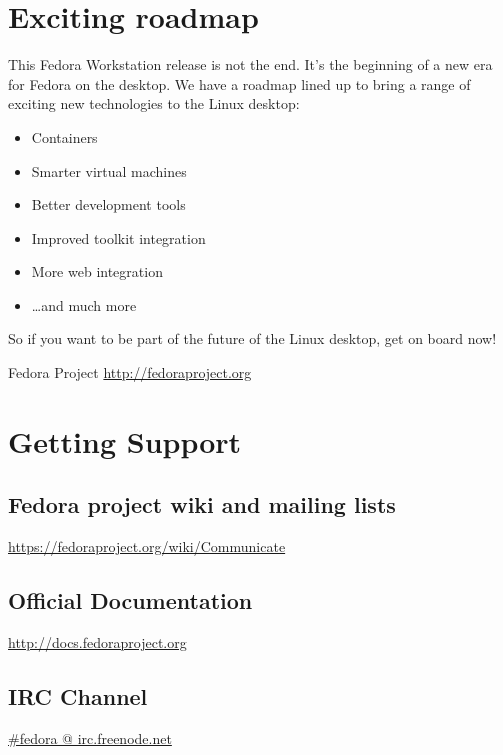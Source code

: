 \documentclass[
a4paper,
10pt
]{leaflet}
\begin{document}
\section{\textcolor{FedoraBlue}{Exciting roadmap}}
This Fedora Workstation release is not the end. It's the beginning of a new era for Fedora on the desktop. We have a roadmap lined up to bring a range of exciting new technologies to the Linux desktop:
\begin{itemize}
  \item Containers
  \item Smarter virtual machines
  \item Better development tools
  \item Improved toolkit integration
  \item More web integration
  \item \ldots and much more
\end{itemize}

So if you want to be part of the future of the Linux desktop, get on board now!
\newpage

\begin{center}
  {\color{FedoraBlue}
  \LARGE{Fedora Project\vspace{1cm}}
  \Large{\href{http://fedoraproject.org}{http://fedoraproject.org}}
}
\end{center}

\section{\textcolor{FedoraBlue}{Getting Support}}
\subsection{Fedora project wiki and mailing lists}
\href{https://fedoraproject.org/wiki/Communicate}{https://fedoraproject.org/wiki/Communicate}

\subsection{Official Documentation}
\href{http://docs.fedoraproject.org}{http://docs.fedoraproject.org}

\subsection{IRC Channel}
\href{http://webchat.freenode.net/?channels=#fedora}{\#fedora @ irc.freenode.net}
\end{document}
